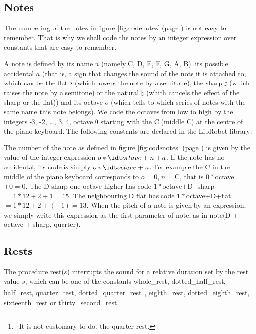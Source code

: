 

\subsection{Notes}

\noindent The numbering of the notes in figure \ref{fig:codenotes} (page \pageref{fig:codenotes}) is
not easy to remember. That is why we shall code the notes by
an integer expression over constants that are easy to remember.

A note is defined by its name $n$ (namely C, D, E, F, G, A, B), its possible
accidental $a$ (that is, a sign that changes the sound of the note it is attached to,
which can be the flat $\flat$ (which lowers the note by a semitone),
the sharp $\sharp$ (which raises the note by a semitone) or
the natural $\natural$ (which cancels the effect of the sharp or the flat)) and
its octave $o$ (which tells to which series of notes with the same name this note belongs).
We code the octaves from low to high by the integers -3, -2, \ldots, 3, 4,
octave 0 starting with the C (middle C) at the centre of the piano keyboard. The
following constants are declared in the {\idt LibRobot} library:



\noindent The number of the note as defined in figure \ref{fig:codenotes}
(page \pageref{fig:codenotes}) is given by the value of the integer expression
$o \ast {\idt octave} + n + a$. If the note has no accidental, its code is simply
$o \ast {\idt octave} + n$. For example the C in the middle of the piano keyboard corresponds to
$o = 0$, $n = ${\idt C}, that is $0 \ast ${\idt octave}$ + 0 = 0$. The D sharp one octave higher
has code $1 \ast ${\idt octave}$ + ${\idt D}$ + ${\idt sharp}$
= 1 \ast 12 + 2 + 1 = 15$. The neighbouring D flat
has code $1 \ast ${\idt octave}$ + ${\idt D}$ + ${\idt flat}$
= 1 \ast 12 + 2 + (-1) = 13$. When the pitch of a note is given by an expression,
we simply write this expression as the first parameter of {\idt note}, as in {\idt note(D + octave + sharp, quarter)}.

\subsection{Rests}

The procedure {\idt rest($s$)} interrupts the sound for a relative duration set by
the rest value $s$, which can be one of the constants
  {\idt whole\_rest},
  {\idt dotted\_half\_rest},
  {\idt half\_rest},
  {\idt quarter\_rest},
  {\idt dot\-ted\_\-quar\-ter\_\-rest}\footnote{\ It is not customary to dot the quarter rest.},
  {\idt eighth\_\-rest},
  {\idt dotted\_eighth\_rest},
  {\idt sixteenth\_rest}
or  {\idt thirty\_second\_rest}.


